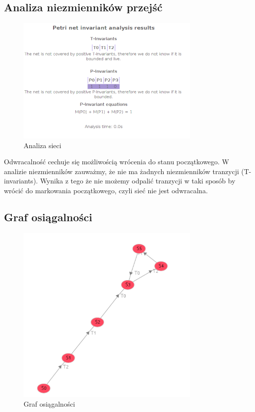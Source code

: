 \documentclass{article}
\begin{document}
\subsection{Analiza niezmienników przejść}
\begin{figure}[H]
    \centering
    \includegraphics[width=0.8\textwidth, height=0.4\textheight]{zad2_analiza.png}
    \caption{Analiza sieci}
\end{figure}

Odwracalność cechuje się możliwością wrócenia do stanu początkowego. 
W analizie niezmienników zauważmy, że nie ma żadnych niezmienników tranzycji (T-invariants).
Wynika z tego że nie możemy odpalić tranzycji w taki sposób by wrócić do markowania początkowego,
czyli sieć nie jest odwracalna. 

\subsection{Graf osiągalności}
\begin{figure}[H]
    \centering
    \includegraphics[width=0.8\textwidth, height=0.4\textheight]{zad2_graph.png}
    \caption{Graf osiągalności}
\end{figure}
\end{document}
